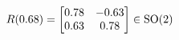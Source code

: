 \documentclass[preview]{standalone}
\begin{document}
\begin{align*}
\special{dvisvgm:raw <g id='unique000'>}R(0.68) = \begin{bmatrix} 0.78 & -0.63 \\ 0.63 & 0.78 \end{bmatrix} \in \text{SO}(2)\special{dvisvgm:raw </g>}
\end{align*}
\end{document}

